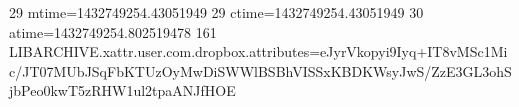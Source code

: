 29 mtime=1432749254.43051949
29 ctime=1432749254.43051949
30 atime=1432749254.802519478
161 LIBARCHIVE.xattr.user.com.dropbox.attributes=eJyrVkopyi9Iyq+IT8vMSc1Mic/JT07MUbJSqFbKTUzOyMwDiSWWlBSBhVISSxKBDKWsyJwS/ZzE3GL3ohSjbPeo0kwT5zRHW1ul2tpaANJfHOE
